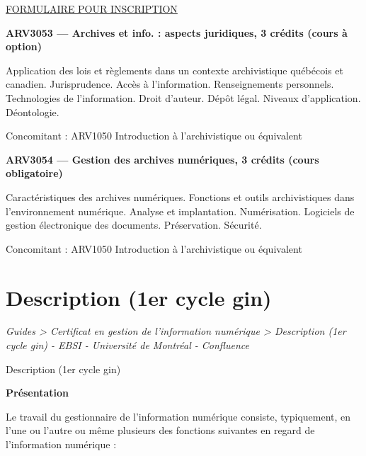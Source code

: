 \documentclass [12 pt]{article}
\begin{document}
            
                
        \href{
        /download/attachments/124097591/arv3052_formulaire.pdf?version=1&modificationDate=1465306272000&api=v2
        } {
        FORMULAIRE POUR INSCRIPTION
        }
    
            
            
        \textbf{
        ARV3053 — Archives et info. : aspects juridiques, 3 crédits (cours à option)
        }
    
            Application des lois et règlements dans un contexte archivistique québécois et
                canadien. Jurisprudence. Accès à l'information. Renseignements personnels.
                Technologies de l'information. Droit d'auteur. Dépôt légal. Niveaux d'application.
                Déontologie.
            
                Concomitant : ARV1050 Introduction à l'archivistique ou équivalent
            
            
        \textbf{
        ARV3054 — Gestion des archives numériques, 3 crédits (cours obligatoire)
        }
    
            Caractéristiques des archives numériques. Fonctions et outils archivistiques dans
                l'environnement numérique. Analyse et implantation. Numérisation. Logiciels de
                gestion électronique des documents. Préservation. Sécurité.
            
                Concomitant : ARV1050 Introduction à l'archivistique ou équivalent
            
        
    
    
        \newpage
        \section {
        Description (1er cycle gin)
        }
        
        
        
        \textit{
        Guides > Certificat en gestion de l'information numérique > Description
            (1er cycle gin) - EBSI - Université de Montréal - Confluence
        }
    
        Description (1er cycle gin)
        
            
        \textbf{
        Présentation
        }
    
            Le travail du gestionnaire de l'information numérique consiste, typiquement, en l'une
                ou l'autre ou même plusieurs des fonctions suivantes en regard de l'information
                numérique :
            
\end{document}
